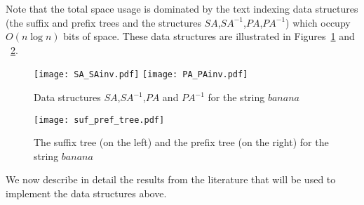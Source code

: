 \documentclass{article}
\newcommand{\?}{\mskip1.5mu}
\begin{document}
Note that the total space usage is dominated by the text indexing data structures (the suffix and prefix trees and the structures $SA$,$SA^{-1}$,$PA$,$PA^{-1}$) which occupy $O(n\log n)$ bits of space. These data structures are illustrated in Figures~\ref{pic:text_idx_DS} and ~\ref{pic:text_idx_DS2}. 

\begin{figure}[htb] 
\centering\texttt{[image: SA\_SAinv.pdf]} 
\texttt{[image: PA\_PAinv.pdf]} 

\caption[justification=centering]{Data structures $SA$,$SA^{-1}$,$PA$ and $PA^{-1}$ for the string $banana$} 

\label{pic:text_idx_DS} \end{figure}

\begin{figure}[htb] 
\centering\texttt{[image: suf\_pref\_tree.pdf]} 
\caption{The suffix tree (on the left) and the prefix tree (on the right) for the string $banana$} \label{pic:text_idx_DS2} \end{figure}

We now describe in detail the results from the literature that will be used to implement the data structures above. 
\end{document}
